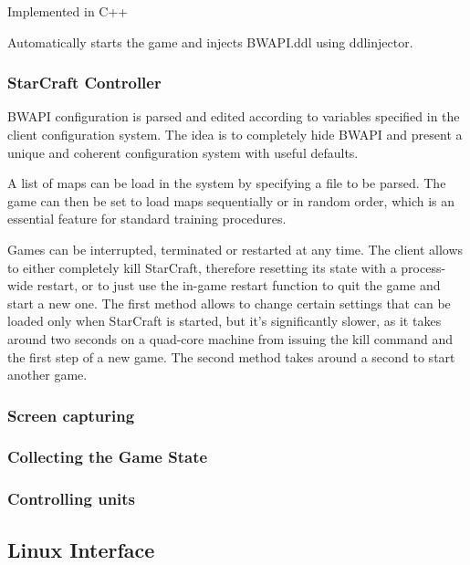 Implemented in C++

Automatically starts the game and injects BWAPI.ddl using ddlinjector. 

\subsubsection{StarCraft Controller}

BWAPI configuration is parsed and edited according to variables specified in the
client configuration system. The idea is to completely hide BWAPI and present a
unique and coherent configuration system with useful defaults.

A list of maps can be load in the system by specifying a file to be parsed. The
game can then be set to load maps sequentially or in random order, which is an
essential feature for standard training procedures.

Games can be interrupted, terminated or restarted at any time. The client allows
to either completely kill StarCraft, therefore resetting its state with a
process-wide restart, or to just use the in-game restart function to quit the
game and start a new one. The first method allows to change certain settings
that can be loaded only when StarCraft is started, but it's significantly
slower, as it takes around two seconds on a quad-core machine from issuing the
kill command and the first step of a new game. The second method takes around a
second to start another game. %



\subsubsection{Screen capturing}

\subsubsection{Collecting the Game State}


\subsubsection{Controlling units}



\subsection{Linux Interface}

